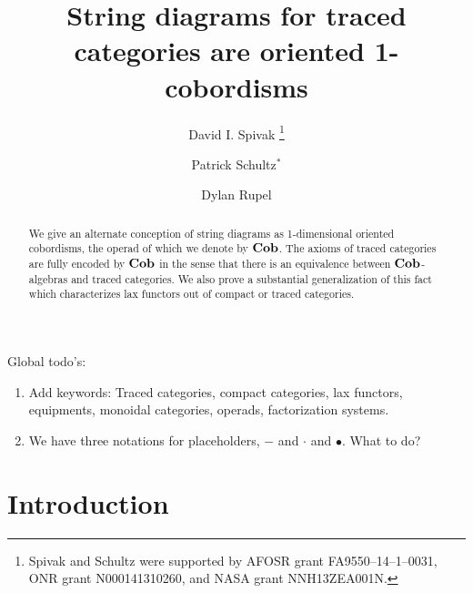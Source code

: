 \documentclass[12pt,oneside,article,draft]{memoir}
\title{String diagrams for traced categories are oriented 1-cobordisms}
\author{
   David I. Spivak
      \thanks{Spivak and Schultz were supported by AFOSR grant FA9550--14--1--0031, ONR grant N000141310260, and NASA grant NNH13ZEA001N.}
   \and Patrick Schultz${}^*$%
   \and Dylan Rupel
}
\begin{document}
\tightlists
\firmlists

\maketitle
\begin{abstract}
   We give an alternate conception of string diagrams as 1-dimensional oriented cobordisms, the
   operad of which we denote by $\mathbf{Cob}$. The axioms of traced categories are fully encoded by $\mathbf{Cob}$
   in the sense that there is an equivalence between $\mathbf{Cob}$-algebras and
   traced categories. We also prove a substantial generalization of this fact which characterizes
   lax functors out of compact or traced categories. 
\end{abstract}
Global todo's:
\begin{enumerate}
   \item Add keywords: Traced categories, compact categories, lax functors, equipments, monoidal categories, operads, factorization systems.
   \item We have three notations for placeholders, $-$ and $\cdot$ and $\bullet$. What to do?
\end{enumerate}

\setcounter{tocdepth}{1}
\tableofcontents*

\chapter{Introduction}
\end{document}
